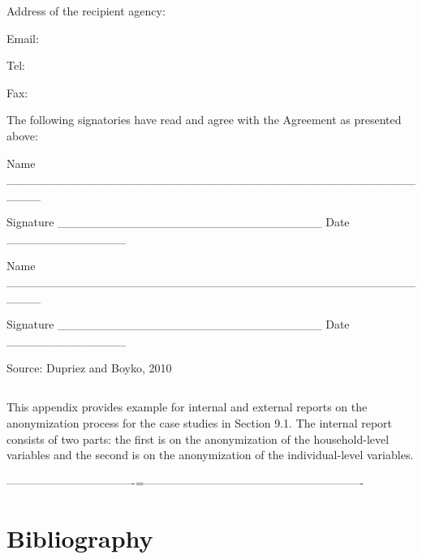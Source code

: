 \documentclass[letterpaper,10pt,english]{sphinxmanual}
\begin{document}
Address of the recipient agency:

Email:

Tel:

Fax:


The following signatories have read and agree with the Agreement as
presented above:


Name \_\_\_\_\_\_\_\_\_\_\_\_\_\_\_\_\_\_\_\_\_\_\_\_\_\_\_\_\_\_\_\_\_\_\_\_\_\_\_\_\_\_\_\_\_\_\_\_\_\_\_\_

Signature \_\_\_\_\_\_\_\_\_\_\_\_\_\_\_\_\_\_\_\_\_\_\_\_\_\_\_\_\_\_\_ Date \_\_\_\_\_\_\_\_\_\_\_\_\_\_


Name \_\_\_\_\_\_\_\_\_\_\_\_\_\_\_\_\_\_\_\_\_\_\_\_\_\_\_\_\_\_\_\_\_\_\_\_\_\_\_\_\_\_\_\_\_\_\_\_\_\_\_\_

Signature \_\_\_\_\_\_\_\_\_\_\_\_\_\_\_\_\_\_\_\_\_\_\_\_\_\_\_\_\_\_\_ Date \_\_\_\_\_\_\_\_\_\_\_\_\_\_

Source: Dupriez and Boyko, 2010


\section{  }
\label{\detokenize{appendices:appendix-c-internal-and-external-reports-for-case-studies}}
This appendix provides example for internal and external reports on the
anonymization process for the case studies in Section 9.1. The internal
report consists of two parts: the first is on the anonymization of the
household-level variables and the second is on the anonymization of the
individual-level variables.

 
———————————-=———————————————————-

\noindent{}



\chapter{Bibliography}
\label{\detokenize{bibliography::doc}}\label{\detokenize{bibliography:bibliography}}
\end{document}
